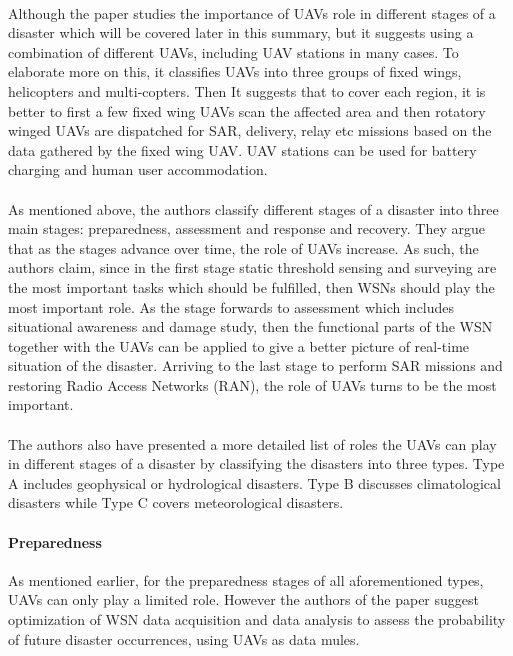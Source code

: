 \documentclass{article}
\begin{document}
	\paragraph{} Although the paper studies the importance of UAVs role in different stages of a disaster which will be covered later in this summary, but it suggests using a combination of different UAVs, including UAV stations in many cases. To elaborate more on this, it classifies UAVs into three groups of fixed wings, helicopters and multi-copters. Then It suggests that to cover each region, it is better to first a few fixed wing UAVs scan the affected area and then rotatory winged UAVs are dispatched for SAR, delivery, relay etc missions based on the data gathered by the fixed wing UAV. UAV stations can be used for battery charging and human user accommodation.
	
	\paragraph{} As mentioned above, the authors classify different stages of a disaster into three main stages: preparedness, assessment and response and recovery. They argue that as the stages advance over time, the role of UAVs increase. As such, the authors claim, since in the first stage static threshold sensing and surveying are the most important tasks which should be fulfilled, then WSNs should play the most important role. As the stage forwards to assessment which includes situational awareness and damage study, then the functional parts of the WSN together with the UAVs can be applied to give a better picture of real-time situation of the disaster. Arriving to the last stage to perform SAR missions and restoring Radio Access Networks (RAN), the role of UAVs turns to be the most important.
	
	\paragraph{} The authors also have presented a more detailed list of roles the UAVs can play in different stages of a disaster by classifying the disasters into three types. Type A includes geophysical or hydrological disasters. Type B discusses climatological disasters while Type C covers meteorological disasters. 
	
	\paragraph{Preparedness} As mentioned earlier, for the preparedness stages of all aforementioned types, UAVs can only play a limited role. However the authors of the paper suggest optimization of WSN data acquisition and data analysis to assess the probability of future disaster occurrences, using UAVs as data mules.
	
\end{document}
